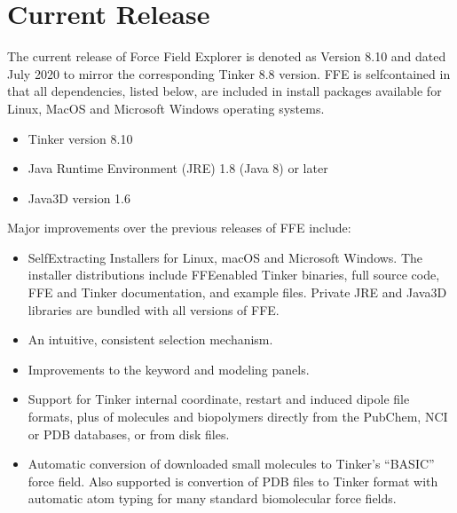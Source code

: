 \documentclass[letterpaper,11pt,english]{sphinxmanual}
\begin{document}
\section{Current Release}
\label{\detokenize{text/introduction:current-release}}
\sphinxAtStartPar
The current release of Force Field Explorer is denoted as Version 8.10 and dated July 2020 to mirror the corresponding Tinker 8.8 version. FFE is self\sphinxhyphen{}contained in that all dependencies, listed below, are included in install packages available for Linux, MacOS and Microsoft Windows operating systems.
\begin{itemize}
\item {} 
\sphinxAtStartPar
Tinker version 8.10

\item {} 
\sphinxAtStartPar
Java Runtime Environment (JRE) 1.8 (Java 8) or later

\item {} 
\sphinxAtStartPar
Java3D version 1.6

\end{itemize}

\sphinxAtStartPar
Major improvements over the previous releases of FFE include:
\begin{itemize}
\item {} 
\sphinxAtStartPar
Self\sphinxhyphen{}Extracting Installers for Linux, macOS and Microsoft Windows. The installer distributions include FFE\sphinxhyphen{}enabled Tinker binaries, full source code, FFE and Tinker documentation, and example files. Private JRE and Java3D libraries are bundled with all versions of FFE.

\item {} 
\sphinxAtStartPar
An intuitive, consistent selection mechanism.

\item {} 
\sphinxAtStartPar
Improvements to the keyword and modeling panels.

\item {} 
\sphinxAtStartPar
Support for Tinker internal coordinate, restart and induced dipole file formats, plus of molecules and biopolymers directly from the PubChem, NCI or PDB databases,  or from disk files.

\item {} 
\sphinxAtStartPar
Automatic conversion of downloaded small molecules to Tinker’s “BASIC” force field. Also supported is convertion of PDB files to Tinker format with automatic atom typing for many standard biomolecular force fields.

\end{itemize}
\end{document}
